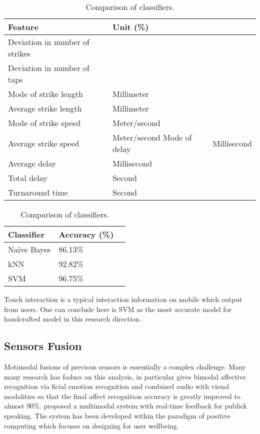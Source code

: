 \begin{table}
  \caption{Comparison of classifiers.}
  \label{tab:touch-feature}
  \scriptsize
  \begin{center}
    \begin{tabular}{lll}
      Feature & Unit (\%)\\
    \hline
    Deviation in number of strikes & \\
    Deviation in number of taps & \\
    Mode of strike length & Millimeter \\
    Average strike length & Millimeter \\ 
    Mode of strike speed  & Meter/second \\ 
    Average strike speed  & Meter/second
    Mode of delay & Millisecond \\
    Average delay & Millisecond \\ 
    Total delay   & Second\\
    Turnaround time & Second\\
    \end{tabular}
  \end{center}
\end{table}

\begin{table}
  \caption{Comparison of classifiers.}
  \label{tab:touch-cls}
  \scriptsize
  \begin{center}
    \begin{tabular}{lll}
      Classifier & Accuracy (\%) \\
    \hline
    Naïve Bayes     & 86.13\%           \\
    kNN                & 92.82\%       \\
    SVM                 & 96.75\%         \\
    \end{tabular}
  \end{center}
\end{table}

Touch interaction is a typical interaction information on mobile which output from users.
One can conclude here is SVM as the most accurate model for handcrafted model in this research direction.


\subsection{Sensors Fusion}\label{subsec:fusion}

Motimodal fusions of previous sensors is essentially a complex challenge. Many many research has foducs on this analysis, in particular \cite{Zeng2004} gives bimodal affective recognition via ficial emotion recognition and combined audio with visual modalities so that the final affect recognition accuracy is greatly improved to almost 90\%. \cite{Dermody2016} proposed a multimodal system with real-time feedback for publick speaking. The system has been developed within the paradigm of positive computing which focuses on designing for user wellbeing.

